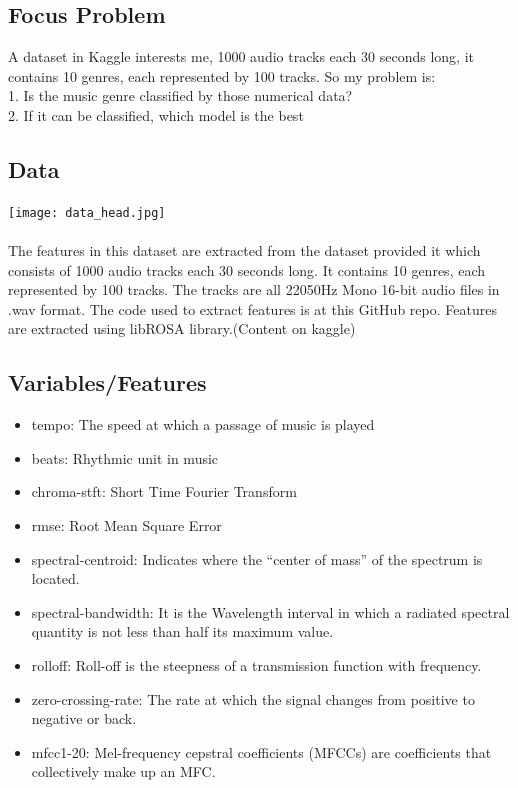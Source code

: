 \documentclass[12pt,a4paper]{article}
\begin{document}
\subsection{Focus Problem}
A dataset in Kaggle interests me, 1000 audio tracks each 30 seconds long, it contains 10 genres, each represented by 100 tracks. So my problem is:\\
1. Is the music genre classified by those numerical data?\\
2. If it can be classified, which model is the best  

\subsection{Data}
\texttt{[image: data\_head.jpg]}\\
\\
The features in this dataset are extracted from the dataset provided it which consists of 1000 audio tracks each 30 seconds long. It contains 10 genres, each represented by 100 tracks. The tracks are all 22050Hz Mono 16-bit audio files in .wav format. The code used to extract features is at this GitHub repo. Features are extracted using libROSA library.(Content on kaggle)

\subsection{Variables/Features}
\begin{itemize}
  \item tempo: The speed at which a passage of music is played
  \item beats: Rhythmic unit in music
  \item chroma-stft: Short Time Fourier Transform
  \item rmse: Root Mean Square Error
  \item spectral-centroid: Indicates where the “center of mass” of the spectrum is located.
  \item spectral-bandwidth: It is the Wavelength interval in which a radiated spectral quantity is not less than half its maximum value.
  \item rolloff: Roll-off is the steepness of a transmission function with frequency.
  \item zero-crossing-rate: The rate at which the signal changes from positive to negative or back.
  \item mfcc1-20: Mel-frequency cepstral coefficients (MFCCs) are coefficients that collectively make up an MFC.
\end{itemize}
\end{document}
